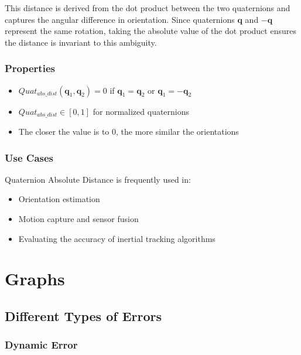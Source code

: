 \documentclass{iutbscthesis}
\begin{document}
This distance is derived from the dot product between the two quaternions and captures the angular difference in orientation. Since quaternions $\mathbf{q}$ and $-\mathbf{q}$ represent the same rotation, taking the absolute value of the dot product ensures the distance is invariant to this ambiguity.

\subsection{Properties}
\begin{itemize}
    \item $Quat_{abs\_dist}(\mathbf{q}_1, \mathbf{q}_2) = 0$ if $\mathbf{q}_1 = \mathbf{q}_2$ or $\mathbf{q}_1 = -\mathbf{q}_2$
    \item $Quat_{abs\_dist} \in [0, 1]$ for normalized quaternions
    \item The closer the value is to $0$, the more similar the orientations
\end{itemize}

\subsection{Use Cases}
Quaternion Absolute Distance is frequently used in:
\begin{itemize}
    \item Orientation estimation
    \item Motion capture and sensor fusion
    \item Evaluating the accuracy of inertial tracking algorithms
\end{itemize}

\chapter{Graphs}\label{appendix:graph}

\section{Different Types of Errors}

\subsection{Dynamic Error}
\end{document}

